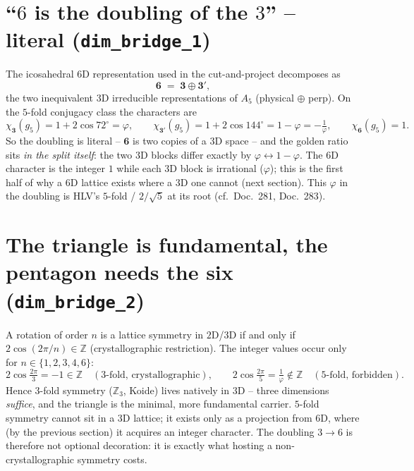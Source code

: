 \section{``$6$ is the doubling of the $3$'' -- literal (\texttt{dim\_bridge\_1})}
The icosahedral $6$D representation used in the cut-and-project decomposes as
\begin{equation}
\mathbf{6} \;=\; \mathbf{3}\oplus\mathbf{3'},
\end{equation}
the two inequivalent $3$D irreducible representations of $A_5$ (physical $\oplus$ perp).
On the $5$-fold conjugacy class the characters are
\begin{equation}
\chi_{\mathbf 3}(g_5)=1+2\cos 72^\circ=\varphi,\qquad
\chi_{\mathbf 3'}(g_5)=1+2\cos144^\circ=1-\varphi=-\tfrac1\varphi,\qquad
\chi_{\mathbf 6}(g_5)=1.
\end{equation}
So the doubling is literal -- $\mathbf 6$ is two copies of a $3$D space -- and the golden
ratio sits \emph{in the split itself}: the two $3$D blocks differ exactly by
$\varphi\leftrightarrow 1-\varphi$. The $6$D character is the integer $1$ while each $3$D
block is irrational ($\varphi$); this is the first half of why a $6$D lattice exists where
a $3$D one cannot (next section). This $\varphi$ in the doubling is HLV's $5$-fold /
$2/\sqrt5$ at its root (cf.\ Doc.~281, Doc.~283).

\section{The triangle is fundamental, the pentagon needs the six (\texttt{dim\_bridge\_2})}
A rotation of order $n$ is a lattice symmetry in $2$D/$3$D if and only if
$2\cos(2\pi/n)\in\mathbb{Z}$ (crystallographic restriction). The integer values occur only
for $n\in\{1,2,3,4,6\}$:
\begin{equation}
2\cos\tfrac{2\pi}{3}=-1\in\mathbb{Z}\quad(\text{3-fold, crystallographic}),\qquad
2\cos\tfrac{2\pi}{5}=\tfrac1\varphi\notin\mathbb{Z}\quad(\text{5-fold, forbidden}).
\end{equation}
Hence $3$-fold symmetry ($\mathbb{Z}_3$, Koide) lives natively in $3$D -- three dimensions
\emph{suffice}, and the triangle is the minimal, more fundamental carrier. $5$-fold
symmetry cannot sit in a $3$D lattice; it exists only as a projection from $6$D, where (by
the previous section) it acquires an integer character. The doubling $3\to6$ is therefore
not optional decoration: it is exactly what hosting a non-crystallographic symmetry costs.

